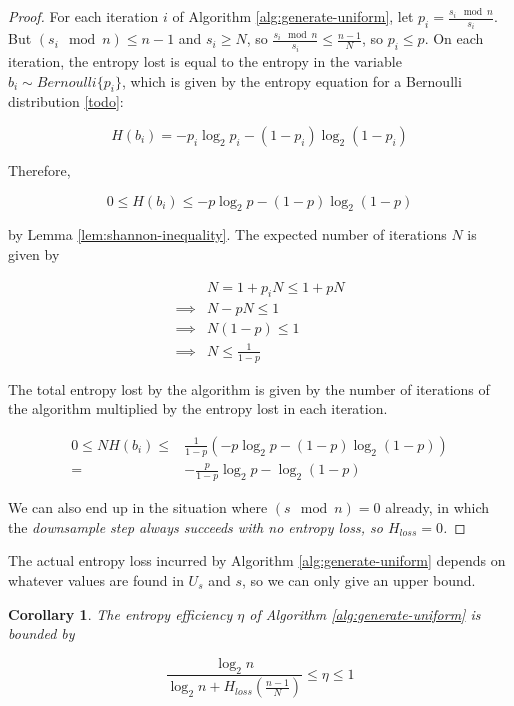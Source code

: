 \documentclass[12pt]{article}
\newtheorem{corollary}{Corollary}
\begin{document}
\begin{proof}
For each iteration $i$ of Algorithm \ref{alg:generate-uniform}, let $p_i = \frac{s_i \mod n}{s_i}$. But $(s_i \mod n) \le n-1$ and $s_i \ge N$, so $\frac{s_i \mod n}{s_i} \le \frac{n-1}{N}$, so $p_i \le p$. On each iteration, the entropy lost is equal to the entropy in the variable $b_i \sim Bernoulli\{p_i\}$, which is given by the entropy equation for a Bernoulli distribution \ref{todo}:

\begin{equation}
H(b_i) = -p_i\log_2p_i - (1-p_i)\log_2(1-p_i)
\end{equation}

Therefore, 

\begin{equation}
0 \le H(b_i) \le -p\log_2p - (1-p)\log_2(1-p) 
\end{equation}


by Lemma \ref{lem:shannon-inequality}. The expected number of iterations $N$ is given by

\begin{align}
& N = 1 + p_iN \le 1 + pN \\
\implies & N-pN \le 1 \\
\implies & N(1-p) \le 1 \\
\implies & N \le \frac{1}{1-p}
\end{align}

The total entropy lost by the algorithm is given by the number of iterations of the algorithm multiplied by the entropy lost in each iteration.

\begin{align}
0 \le NH(b_i) \le & \frac{1}{1-p}(-p\log_2p - (1-p)\log_2(1-p) ) \\
= & -\frac{p}{1-p}\log_2p - \log_2(1-p)
\end{align}

We can also end up in the situation where $(s \mod n) = 0$ already, in which the \em downsample \em step always succeeds with no entropy loss, so $H_{loss}=0$.
\end{proof}

The actual entropy loss incurred by Algorithm \ref{alg:generate-uniform} depends on whatever values are found in $U_s$ and $s$, so we can only give an upper bound.

\begin{corollary}
The entropy efficiency $\eta$ of Algorithm \ref{alg:generate-uniform} is bounded by

\begin{equation}
\frac{\log_2n}{\log_2n + H_{loss}(\frac{n-1}{N})} \le \eta \le 1
\label{eq:generate-uniform-efficiency}
\end{equation}
\end{corollary}
\end{document}
